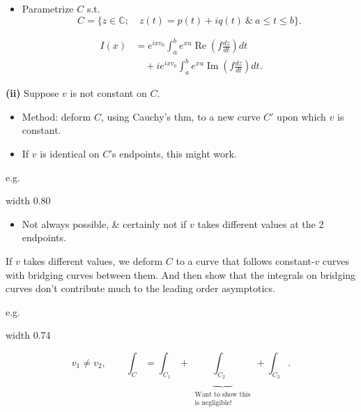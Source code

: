 \documentclass[11pt,a4paper]{article}
\begin{document}
\begin{itemize}
    \item Parametrize $C$ s.t.
    \[
        C=\bigl\{z\in\mathbb C;\quad
        z(t)=p(t)+iq(t)\ \&\ a\leq t\leq b\bigr\}.
    \]
\end{itemize}
\begin{align*}
    I(x)&=e^{ixv_0}\int_a^b e^{xu}
    \operatorname{Re}\!\left(f\frac{dz}{dt}\right)dt\\
    &\quad+i e^{ixv_0}\int_a^b e^{xu}
    \operatorname{Im}\!\left(f\frac{dz}{dt}\right)dt.
\end{align*}

\clearpage
\noindent\textbf{(ii)} Suppose $v$ is not constant on $C$.

\begin{itemize}
    \item Method: deform $C$, using Cauchy's thm, to a new curve $C'$
    upon which $v$ is constant.
    \item If $v$ is identical on $C$'s endpoints, this might work.
\end{itemize}

\noindent e.g.
\begin{center}
    \pdfximage width 0.80\linewidth {figures/asymptotic-lecture9/equal-endpoint-phase.png}
    \leavevmode\pdfrefximage\pdflastximage
\end{center}

\begin{itemize}
    \item Not always possible, \& certainly not if $v$ takes different
    values at the 2 endpoints.
\end{itemize}

If $v$ takes different values, we deform $C$ to a curve that follows
constant-$v$ curves with bridging curves between them. And then show
that the integrals on bridging curves don't contribute much to the
leading order asymptotics.

\medskip
\noindent e.g.
\begin{center}
    \pdfximage width 0.74\linewidth {figures/asymptotic-lecture9/bridging-contour.png}
    \leavevmode\pdfrefximage\pdflastximage
\end{center}
\[
    v_1\neq v_2,\qquad
    \int_C=\int_{C_1}+\underbrace{\int_{C_2}}_{
        \substack{\text{Want to show this}\\\text{is negligible!}}}
        +\int_{C_3}.
\]
\end{document}
